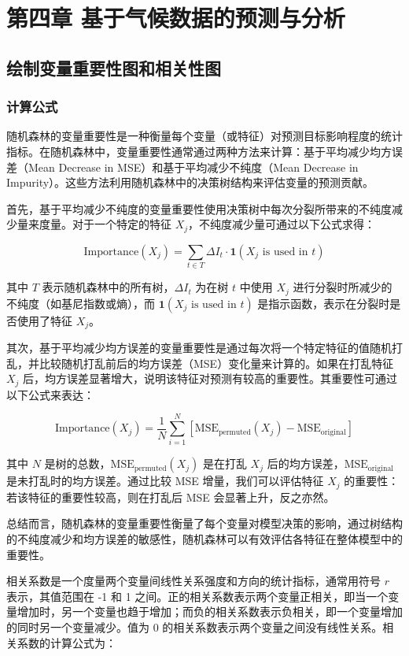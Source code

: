 \documentclass{article}
\begin{document}
	\section{第四章 基于气候数据的预测与分析}
	
	\subsection{绘制变量重要性图和相关性图}
	
	
	\subsubsection{计算公式}
	随机森林的变量重要性是一种衡量每个变量（或特征）对预测目标影响程度的统计指标。在随机森林中，变量重要性通常通过两种方法来计算：基于平均减少均方误差（Mean Decrease in MSE）和基于平均减少不纯度（Mean Decrease in Impurity）。这些方法利用随机森林中的决策树结构来评估变量的预测贡献。
	
	首先，基于平均减少不纯度的变量重要性使用决策树中每次分裂所带来的不纯度减少量来度量。对于一个特定的特征 \( X_j \)，不纯度减少量可通过以下公式求得：
	
	\[
	\text{Importance}(X_j) = \sum_{t \in T} \Delta I_t \cdot \mathbf{1}(X_j \text{ is used in } t)
	\]
	
	其中 \( T \) 表示随机森林中的所有树，\( \Delta I_t \) 为在树 \( t \) 中使用 \( X_j \) 进行分裂时所减少的不纯度（如基尼指数或熵），而 \( \mathbf{1}(X_j \text{ is used in } t) \) 是指示函数，表示在分裂时是否使用了特征 \( X_j \)。
	
	其次，基于平均减少均方误差的变量重要性是通过每次将一个特定特征的值随机打乱，并比较随机打乱前后的均方误差（MSE）变化量来计算的。如果在打乱特征 \( X_j \) 后，均方误差显著增大，说明该特征对预测有较高的重要性。其重要性可通过以下公式来表达：
	
	\[
	\text{Importance}(X_j) = \frac{1}{N} \sum_{i=1}^{N} \left[ \text{MSE}_{\text{permuted}}(X_j) - \text{MSE}_{\text{original}} \right]
	\]
	
	其中 \( N \) 是树的总数，\( \text{MSE}_{\text{permuted}}(X_j) \) 是在打乱 \( X_j \) 后的均方误差，\( \text{MSE}_{\text{original}} \) 是未打乱时的均方误差。通过比较 MSE 增量，我们可以评估特征 \( X_j \) 的重要性：若该特征的重要性较高，则在打乱后 MSE 会显著上升，反之亦然。
	
	总结而言，随机森林的变量重要性衡量了每个变量对模型决策的影响，通过树结构的不纯度减少和均方误差的敏感性，随机森林可以有效评估各特征在整体模型中的重要性。
	
	相关系数是一个度量两个变量间线性关系强度和方向的统计指标，通常用符号 \( r \) 表示，其值范围在 -1 和 1 之间。正的相关系数表示两个变量正相关，即当一个变量增加时，另一个变量也趋于增加；而负的相关系数表示负相关，即一个变量增加的同时另一个变量减少。值为 0 的相关系数表示两个变量之间没有线性关系。相关系数的计算公式为：
	
\end{document}
